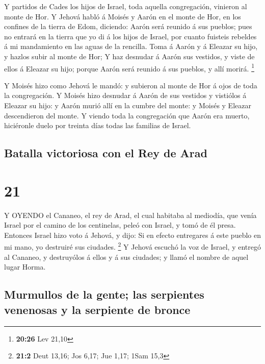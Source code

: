  Y partidos de Cades los hijos de Israel, toda aquella
congregación, vinieron al monte de Hor.  Y Jehová habló á
Moisés y Aarón en el monte de Hor, en los confines de la tierra de Edom,
diciendo:  Aarón será reunido á sus pueblos; pues no
entrará en la tierra que yo di á los hijos de Israel, por cuanto
fuisteis rebeldes á mi mandamiento en las aguas de la rencilla.
 Toma á Aarón y á Eleazar su hijo, y hazlos subir al monte
de Hor;  Y haz desnudar á Aarón sus vestidos, y viste de
ellos á Eleazar su hijo; porque Aarón será reunido á sus pueblos, y allí
morirá. \footnote{\textbf{20:26} Lev 21,10}

 Y Moisés hizo como Jehová le mandó: y subieron al monte de
Hor á ojos de toda la congregación.  Y Moisés hizo desnudar
á Aarón de sus vestidos y vistiólos á Eleazar su hijo: y Aarón murió
allí en la cumbre del monte: y Moisés y Eleazar descendieron del monte.
 Y viendo toda la congregación que Aarón era muerto,
hiciéronle duelo por treinta días todas las familias de Israel.

\hypertarget{batalla-victoriosa-con-el-rey-de-arad}{%
\subsection{Batalla victoriosa con el Rey de
Arad}\label{batalla-victoriosa-con-el-rey-de-arad}}

\hypertarget{section-20}{%
\section{21}\label{section-20}}

 Y OYENDO el Cananeo, el rey de Arad, el cual habitaba al
mediodía, que venía Israel por el camino de los centinelas, peleó con
Israel, y tomó de él presa.  Entonces Israel hizo voto á
Jehová, y dijo: Si en efecto entregares á este pueblo en mi mano, yo
destruiré sus ciudades. \footnote{\textbf{21:2} Deut 13,16; Jos 6,17;
  Jue 1,17; 1Sam 15,3}  Y Jehová escuchó la voz de Israel, y
entregó al Cananeo, y destruyólos á ellos y á sus ciudades; y llamó el
nombre de aquel lugar Horma.

\hypertarget{murmullos-de-la-gente-las-serpientes-venenosas-y-la-serpiente-de-bronce}{%
\subsection{Murmullos de la gente; las serpientes venenosas y la
serpiente de
bronce}\label{murmullos-de-la-gente-las-serpientes-venenosas-y-la-serpiente-de-bronce}}

